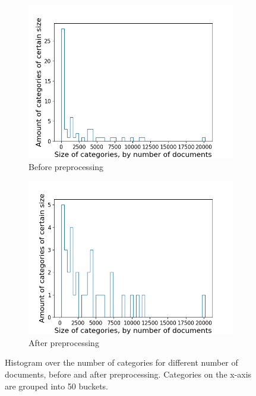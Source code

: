 \begin{figure}[ht]
	\centering
	\begin{subfigure}{0.45\textwidth}
		\centering
		\includegraphics[width=\linewidth]{figures/category_hist2_before.png}
		\caption{Before preprocessing}
		\label{fig:category_hist_before}
	\end{subfigure}
	\begin{subfigure}{0.45\textwidth}
		\centering
		\includegraphics[width=\linewidth]{figures/category_hist2_140.png}
		\caption{After preprocessing}
		\label{fig:category_hist_after}
	\end{subfigure}
	\caption{Histogram over the number of categories for different number of documents, before and after preprocessing.
	Categories on the x-axis are grouped into 50 buckets.}
	\label{fig:category_hist}
\end{figure}

